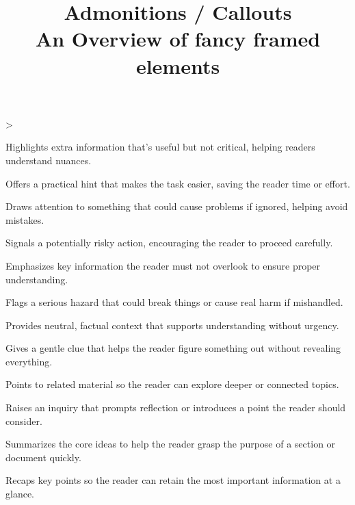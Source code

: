 \documentclass[twoside]{article}
\title{Admonitions / Callouts\\[0.5em]\large An Overview of \textbf{fancy} framed elements}
\author{}\date{}
\makeatletter
\newcommand\tsreplayfn{
\ts@loopcnt\z@
\loop
\advance\ts@loopcnt\@ne
\ifnum\ts@loopcnt>\ts@affilcnt\else
\xdef\@thefnmark{\csname ts@affilM\the\ts@loopcnt\endcsname}
\@footnotetext{\csname ts@affilT\the\ts@loopcnt\endcsname}
\repeat
}
\makeatother
\begin{document}
\twocolumn[{
\maketitle
}]
\tsreplayfn
\begin{tscallout}[kind=note]
Highlights extra information that's useful but not critical, helping readers understand nuances.
\end{tscallout}
\begin{tscallout}[kind=tip]
Offers a practical hint that makes the task easier, saving the reader time or effort.
\end{tscallout}
\begin{tscallout}[kind=warning]
Draws attention to something that could cause problems if ignored, helping avoid mistakes.
\end{tscallout}
\begin{tscallout}[kind=caution]
Signals a potentially risky action, encouraging the reader to proceed carefully.
\end{tscallout}
\begin{tscallout}[kind=important]
Emphasizes key information the reader must not overlook to ensure proper understanding.
\end{tscallout}
\begin{tscallout}[kind=danger]
Flags a serious hazard that could break things or cause real harm if mishandled.
\end{tscallout}
\begin{tscallout}[kind=info]
Provides neutral, factual context that supports understanding without urgency.
\end{tscallout}
\begin{tscallout}[kind=hint]
Gives a gentle clue that helps the reader figure something out without revealing everything.
\end{tscallout}
\begin{tscallout}[kind=seealso]
Points to related material so the reader can explore deeper or connected topics.
\end{tscallout}
\begin{tscallout}[kind=question]
Raises an inquiry that prompts reflection or introduces a point the reader should consider.
\end{tscallout}
\begin{tscallout}[kind=abstract]
Summarizes the core ideas to help the reader grasp the purpose of a section or document quickly.
\end{tscallout}
\begin{tscallout}[kind=summary]
Recaps key points so the reader can retain the most important information at a glance.
\end{tscallout}
\end{document}
